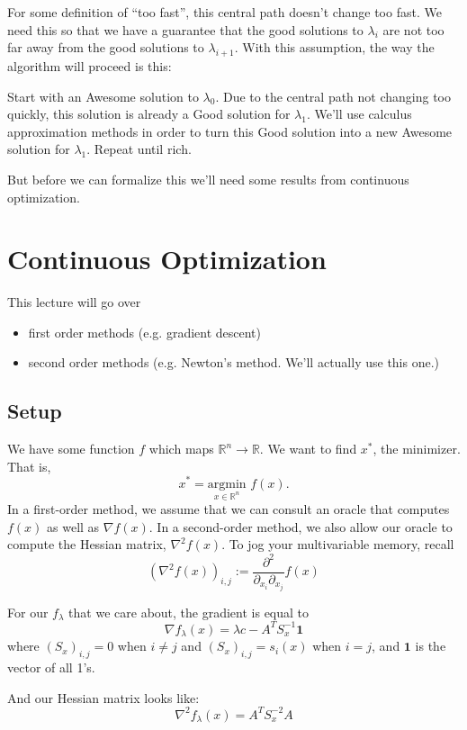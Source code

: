 \documentclass[11pt]{article}
\newcommand{\Rn}{\mathbb{R}^n}
\newcommand{\arr}{\mathbb{R}}
\begin{document}
For some definition of ``too fast'', this central path doesn't change too fast. We need this so that we have a guarantee that the good solutions to $\lambda_i$ are not too far away from the good solutions to $\lambda_{i+1}$. With this assumption, the way the algorithm will proceed is this:

Start with an Awesome solution to $\lambda_0$. Due to the central path not changing too quickly, this solution is already a Good solution for $\lambda_1$. We'll use calculus approximation methods in order to turn this Good solution into a new Awesome solution for $\lambda_1$. Repeat until rich.

But before we can formalize this we'll need some results from continuous optimization.

\section{Continuous Optimization}

This lecture will go over
\begin{itemize}
	\item first order methods (e.g. gradient descent)
	\item second order methods (e.g. Newton's method. We'll actually use this one.)
\end{itemize}

\subsection{Setup}
\newcommand{\xstar}{x^*}
\newcommand{\grad}{\nabla}
\newcommand{\hessian}{\nabla^2}
We have some function $f$ which maps $\Rn \to \arr$. We want to find $\xstar$, the minimizer. That is,
\[
\xstar = \underset{x \in \Rn}{\text{argmin}}\,\, f(x).
\]
In a first-order method, we assume that we can consult an oracle that computes $f(x)$ as well as $\nabla f(x)$. In a second-order method, we also allow our oracle to compute the Hessian matrix, $\hessian f(x)$. To jog your multivariable memory, recall
\[
(\hessian f(x))_{i, j} := \frac{\partial^2}{\partial_{x_i}\partial_{x_j}} f(x)
\]

For our $f_\lambda$ that we care about, the gradient is equal to
\[
\grad f_{\lambda}(x) = \lambda c - A^T S_x^{-1} \mathbf{1}
\]
where $(S_x)_{i, j} = 0$ when $i \neq j$ and $(S_x)_{i, j} = s_i(x)$ when $i = j$, and $\mathbf{1}$ is the vector of all 1's.

And our Hessian matrix looks like:
\[
\hessian f_\lambda(x) = A^T S_x^{-2}A
\]
\end{document}
